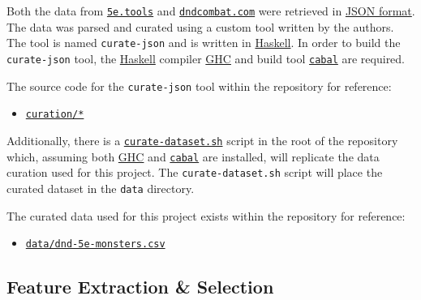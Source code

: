 \documentclass[12pt]{diazessay}
\providecommand{\tightlist}{%
  \setlength{\itemsep}{0pt}\setlength{\parskip}{0pt}}
\begin{document}
Both the data from
\href{https://5etools-mirror-1.github.io/}{\texttt{5e.tools}} and
\href{https://www.dndcombat.com/dndcombat/Welcome.do?page=Compendium}{\texttt{dndcombat.com}}
were retrieved in \href{https://en.wikipedia.org/wiki/JSON}{JSON
format}. The data was parsed and curated using a custom tool written by
the authors. The tool is named \texttt{curate-json} and is written in
\href{https://www.haskell.org/}{Haskell}. In order to build the
\texttt{curate-json} tool, the \href{https://www.haskell.org/}{Haskell}
compiler \href{https://www.haskell.org/ghc/download.html}{GHC} and build
tool \href{https://www.haskell.org/cabal/download.html}{\texttt{cabal}}
are required.

The source code for the \texttt{curate-json} tool  within the repository for reference:

\begin{itemize}
\tightlist
\item
  \href{https://github.com/recursion-ninja/CSCI-795-ML/tree/main/curation}{\texttt{curation/*}}
\end{itemize}

Additionally, there is a
\href{https://github.com/recursion-ninja/CSCI-795-ML/blob/main/curate-dataset.sh}{\texttt{curate-dataset.sh}}
script in the root of the repository which, assuming both
\href{https://www.haskell.org/ghc/download.html}{GHC} and
\href{https://www.haskell.org/cabal/download.html}{\texttt{cabal}} are
installed, will replicate the data curation used for this project. The
\texttt{curate-dataset.sh} script will place the curated dataset in the
\texttt{data} directory.

The curated data used for this project exists within the repository for reference:

\begin{itemize}
\tightlist
\item
  \href{https://github.com/recursion-ninja/CSCI-795-ML/blob/main/data/dnd-5e-monsters.csv}{\texttt{data/dnd-5e-monsters.csv}}
\end{itemize}

\hypertarget{feature-extraction--selection}{%
\subsection{Feature Extraction \& Selection}\label{feature-extraction--selection}}
\end{document}
